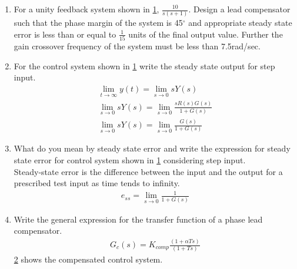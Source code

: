 \begin{enumerate}[label=\thesection.\arabic*.,ref=\thesection.\theenumi]

\item For a unity feedback system shown in \ref{fig:ee18btech11044_1}, $\frac{10}{s(s+1)}$. Design a lead compensator such that the phase margin of the system is 45$^{\circ}$ and appropriate steady state error is less than or equal to $\frac{1}{15}$ units of the final output value. Further the gain crossover frequency of the system must be less than 7.5rad/sec. \\


\item For the control system shown in \ref{fig:ee18btech11044_1} write the steady state output for step input. \\
\solution
\begin{align}
\lim_{t\to\infty} y(t)  = \lim_{s\to0} sY(s) \\
\lim_{s\to0} sY(s) = \lim_{s\to0}  \frac{s R(s) G(s)}{1+G(s)} \\
\lim_{s\to0} sY(s) = \lim_{s\to0} \frac{G(s)}{1 + G(s)}
\end{align}
\begin{figure}[!ht]
	\begin{center}
		\resizebox{\columnwidth}{!}{}
	\end{center}
\caption{}
\label{fig:ee18btech11044_1}
\end{figure}

\item What do you mean by steady state error and write the expression for steady state error for control system shown in \ref{fig:ee18btech11044_1} considering step input. \\
\solution 
Steady-state error is the difference between the input and the output for a prescribed test input as time tends to infinity.
\begin{align}
    e_{ss} = \lim_{s\to0} \frac{1}{1 +G(s)}
\end{align}


\item Write the general expression for the transfer function of a phase lead compensator. \\
\solution 
\begin{align}
    G_c(s) =  K_{comp}    \frac{(1+\alpha T s)}{(1+ T s)} 
\end{align}
\ref{fig:ee18btech11044_2} shows the compensated control system.
\begin{figure}[!ht]
	\begin{center}
		\resizebox{\columnwidth}{!}{}
	\end{center}
\caption{}
\label{fig:ee18btech11044_2}
\end{figure}



\end{enumerate}

